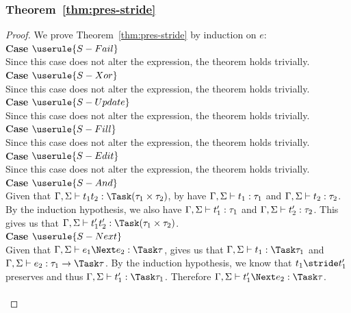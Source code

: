 \subsubsection{Theorem~\ref{thm:pres-stride}}
\begin{proof}
  We prove Theorem~\ref{thm:pres-stride} by induction on $e$:\\

  \noindent\textbf{Case} $\userule{S-Fail}$ \\
    \indent  Since this case does not alter the
  expression, the theorem holds trivially.\\

  \noindent\textbf{Case} $\userule{S-Xor}$ \\
    \indent  Since this case does not alter the
  expression, the theorem holds trivially.\\

  \noindent\textbf{Case} $\userule{S-Update}$ \\
    \indent  Since this case does not alter
  the expression, the theorem holds trivially.\\

  \noindent\textbf{Case} $\userule{S-Fill}$ \\
    \indent  Since this case does not alter the
  expression, the theorem holds trivially.\\

  \noindent\textbf{Case} $\userule{S-Edit}$ \\
    \indent  Since this case does not alter the
  expression, the theorem holds trivially.\\

  \noindent\textbf{Case} $\userule{S-And}$ \\
    \indent  Given that
  $\Gamma,\Sigma\infers t_1\And t_2:\Task(\tau_1\times\tau_2)$, by
   have $\Gamma,\Sigma\vdash t_1:\tau_1$ and
  $\Gamma,\Sigma\vdash t_2:\tau_2$. By the induction hypothesis, we also have $\Gamma,\Sigma\vdash t_1':\tau_1$ and $\Gamma,\Sigma\vdash t_2':\tau_2$.
  This gives us that
  $\Gamma,\Sigma\infers t_1'\And t_2':\Task(\tau_1\times\tau_2)$.\\

  \noindent\textbf{Case} $\userule{S-Next}$ \\
    \indent  Given that
  $\Gamma,\Sigma\infers e_1\Next e_2:\Task \tau$,  gives us that $\Gamma,\Sigma\infers t_1:\Task\tau_1$ and
  $\Gamma,\Sigma\infers e_2:\tau_1 \to \Task \tau$. By the induction hypothesis,
  we know that $t_1\stride t_1'$ preserves and thus
  $\Gamma,\Sigma\infers t_1':\Task\tau_1$. Therefore
  $\Gamma,\Sigma\infers t_1'\Next e_2:\Task\tau$.\\\\


\end{proof}
